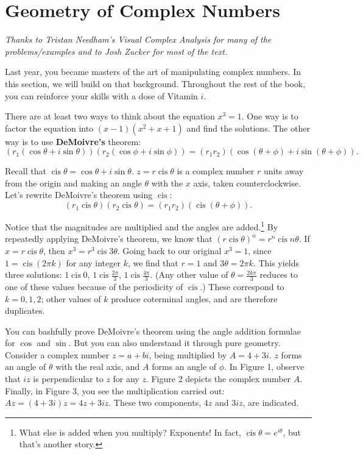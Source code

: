 \documentclass[../gatm.tex]{subfiles}
\begin{document}

\section{Geometry of Complex Numbers}

\newcommand{\Arg} {\operatorname{Arg}}
\newcommand{\cis} {\operatorname{cis}}
\newcommand{\Real} {\operatorname{Re}}
\newcommand{\Imag} {\operatorname{Im}}

\textit{Thanks to Tristan Needham's \emph{Visual Complex Analysis} for many of the problems/examples and to Josh Zucker for most of the text.}

Last year, you became masters of the art of manipulating complex numbers. In this section, we will build on that background. Throughout the rest of the book, you can reinforce your skills with a dose of Vitamin $i$.

There are at least two ways to think about the equation $x^3 = 1$. One way is to factor the equation into $(x-1)(x^2+x+1)$ and find the solutions. The other way is to use \textbf{DeMoivre’s} theorem:
\[(r_1 (\cos \theta + i \sin \theta)) (r_2 (\cos \phi + i \sin \phi)) = (r_1r_2) (\cos(\theta + \phi) + i \sin(\theta + \phi)).\]

Recall that $\cis \theta = \cos \theta + i \sin \theta$. $z=r\cis \theta$ is a complex number $r$ units away from the origin and making an angle $\theta$ with the $x$ axis, taken counterclockwise. Let’s rewrite DeMoivre’s theorem using $\cis$:
\[(r_1 \cis \theta)(r_2 \cis \theta) = (r_1r_2)(\cis(\theta + \phi)).\]

Notice that the magnitudes are multiplied and the angles are added.\footnote{What else is added when you multiply? Exponents! In fact, $\cis \theta = e^{i\theta}$, but that’s another story.} By repeatedly applying DeMoivre's theorem, we know that $(r \cis \theta) ^ n = r^n \cis n\theta$. If $x = r \cis \theta$, then $x^3 = r^3 \cis 3\theta$. Going back to our original $x^3 = 1$, since $1 = \cis(2\pi k)$ for any integer $k$, we find that $r = 1$ and $3\theta = 2\pi k$. This yields three solutions: $1 \cis 0$, $1 \cis \frac{2\pi}{3}$, $1 \cis \frac{4\pi}{3}$. (Any other value of $\theta=\frac{2k\pi}{3}$ reduces to one of these values because of the periodicity of $\cis$.) These correspond to $k = 0, 1, 2$; other values of $k$ produce coterminal angles, and are therefore duplicates.

You can bashfully prove DeMoivre’s theorem using the angle addition formulae for $\cos$ and $\sin$. But you can also understand it through pure geometry. Consider a complex number $z = a + bi$, being multiplied by $A = 4 + 3i$. $z$ forms an angle of $\theta$ with the real axis, and $A$ forms an angle of $\phi$. In Figure 1, observe that $iz$ is perpendicular to $z$ for any $z$. Figure 2 depicts the complex number $A$. Finally, in Figure 3, you see the multiplication carried out: $Az = (4+3i)z = 4z + 3iz$. These two components, $4z$ and $3iz$, are indicated.
\end{document}
